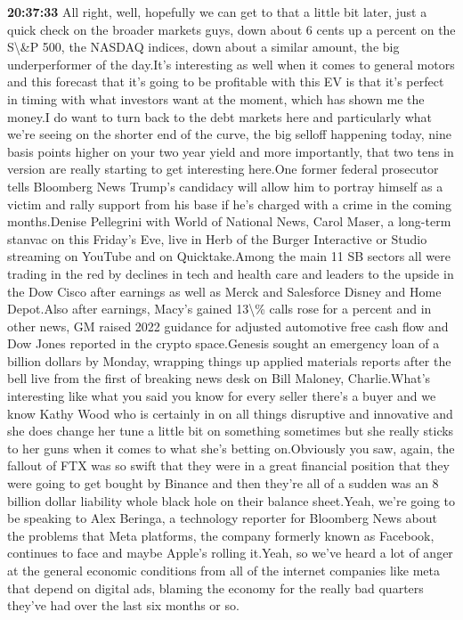 \documentclass{article}%
\begin{document}
\textbf{20:37:33}%
\newline%
All right, well, hopefully we can get to that a little bit later, just a quick check on the broader markets guys, down about 6 cents up a percent on the S\textbackslash{}\&P 500, the NASDAQ indices, down about a similar amount, the big underperformer of the day.It's interesting as well when it comes to general motors and this forecast that it's going to be profitable with this EV is that it's perfect in timing with what investors want at the moment, which has shown me the money.I do want to turn back to the debt markets here and particularly what we're seeing on the shorter end of the curve, the big selloff happening today, nine basis points higher on your two year yield and more importantly, that two tens in version are really starting to get interesting here.One former federal prosecutor tells Bloomberg News Trump's candidacy will allow him to portray himself as a victim and rally support from his base if he's charged with a crime in the coming months.Denise Pellegrini with World of National News, Carol Maser, a long{-}term stanvac on this Friday's Eve, live in Herb of the Burger Interactive or Studio streaming on YouTube and on Quicktake.Among the main 11 SB sectors all were trading in the red by declines in tech and health care and leaders to the upside in the Dow Cisco after earnings as well as Merck and Salesforce Disney and Home Depot.Also after earnings, Macy's gained 13\textbackslash{}\% calls rose for a percent and in other news, GM raised 2022 guidance for adjusted automotive free cash flow and Dow Jones reported in the crypto space.Genesis sought an emergency loan of a billion dollars by Monday, wrapping things up applied materials reports after the bell live from the first of breaking news desk on Bill Maloney, Charlie.What's interesting like what you said you know for every seller there's a buyer and we know Kathy Wood who is certainly in on all things disruptive and innovative and she does change her tune a little bit on something sometimes but she really sticks to her guns when it comes to what she's betting on.Obviously you saw, again, the fallout of FTX was so swift that they were in a great financial position that they were going to get bought by Binance and then they're all of a sudden was an 8 billion dollar liability whole black hole on their balance sheet.Yeah, we're going to be speaking to Alex Beringa, a technology reporter for Bloomberg News about the problems that Meta platforms, the company formerly known as Facebook, continues to face and maybe Apple's rolling it.Yeah, so we've heard a lot of anger at the general economic conditions from all of the internet companies like meta that depend on digital ads, blaming the economy for the really bad quarters they've had over the last six months or so.%
\end{document}
